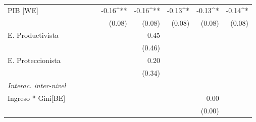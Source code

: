 \documentclass[12pt,letterpaper]{article}
\begin{document}
\begin{landscape}
\begin{table}
\begin{center}
\begin{tabular}{l D{.}{.}{5} D{.}{.}{5} D{.}{.}{5} D{.}{.}{5} D{.}{.}{5} D{.}{.}{5} D{.}{.}{5} D{.}{.}{5} D{.}{.}{5} }
				PIB [WE]                      &                        &                        &                        &                        & -0.16^{**}             & -0.16^{**}             & -0.13^{*}              & -0.13^{*}              & -0.14^{*}                  \\
				&                        &                        &                        &                        & (0.08)                 & (0.08)                 & (0.08)                 & (0.08)                 & (0.08)                 \\
				E. Productivista              &                        &                        &                        &                        &                        & 0.45                   &                        &                        &                        \\
				&                        &                        &                        &                        &                        & (0.46)                 &                        &                        &                        \\
				E. Proteccionista             &                        &                        &                        &                        &                        & 0.20                   &                        &                        &                        \\
				&                        &                        &                        &                        &                        & (0.34)                 &                        &                        &                        \\
				\textit{Interac. inter-nivel} &                        &                        &                        &                        &                        &                        &                        &                        &                        \\
				Ingreso * Gini[BE]            &                        &                        &                        &                        &                        &                        &                        & 0.00                   &                        \\
				&                        &                        &                        &                        &                        &                        &                        & (0.00)                 &                        \\

\end{tabular}
\end{center}
\end{table}
\end{landscape}
\end{document}
